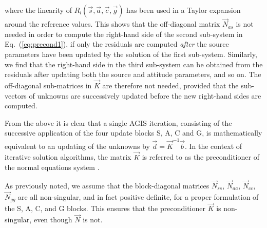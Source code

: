 \documentclass[structabstract]{aa}
\begin{document}
where the linearity of $R_l(\vec{s},\vec{a},\vec{c},\vec{g})$ has been used in a 
Taylor expansion around the reference values. This shows that the off-diagonal 
matrix $\vec{N}_{as}$ is not needed in order to compute the right-hand side
of the second sub-system in Eq.~(\ref{eq:precond1}), if only the residuals
are computed \emph{after} the source parameters have been updated by the 
solution of the first sub-system. Similarly, we find that
the right-hand side in the third sub-system can be obtained from the residuals
after updating both the source and attitude parameters, and so on. The off-diagonal
sub-matrices in $\vec{K}$ are therefore not needed, provided that the
sub-vectors of unknowns are successively updated before the new right-hand sides
are computed.

From the above it is clear that a single AGIS iteration, consisting of the
successive application of the four update blocks S, A, C and G, is mathematically
equivalent to an updating of the unknowns by $\vec{d}=\vec{K}^{-1}\vec{b}$.
In the context of iterative solution algorithms, the matrix $\vec{K}$ is referred
to as the preconditioner of the normal equations system \citep{axelsson96}.

As previously noted, we assume that the block-diagonal matrices 
$\vec{N}_{ss}$, $\vec{N}_{aa}$, $\vec{N}_{cc}$, $\vec{N}_{gg}$ are all 
non-singular, and in fact positive definite, for a proper formulation 
of the S, A, C, and G blocks. This ensures that the preconditioner 
$\vec{K}$ is non-singular, even though $\vec{N}$ is not.
\end{document}
